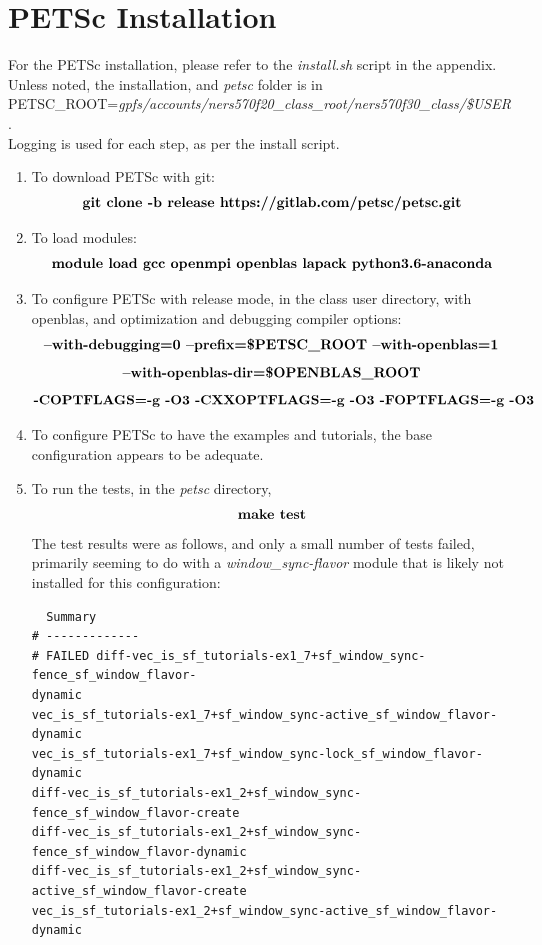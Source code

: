 \documentclass[12pt,letterpaper]{article}
\title{\large \doctitle}
\author{}
\date{}%
\newcommand{\exe}{PETSc }
\newcommand{\cmd}[1]{$$\textrm{\textbf{#1}}$$}
\newcommand{\dir}{\textit{petsc }}
\begin{document}
\maketitle
\thispagestyle{fancy}
\singlespacing

\section{\exe Installation}
For the \exe installation, please refer to the \textit{install.sh} script in the appendix. Unless noted, the installation, and \dir folder is in \\
PETSC\_ROOT=\textit{gpfs/accounts/ners570f20\_class\_root/ners570f30\_class/\$USER}.  \\
Logging is used for each step, as per the install script.
\begin{enumerate}
  \item To download \exe with git: \cmd{git clone -b release https://gitlab.com/petsc/petsc.git}
  \item To load modules: \cmd{module load gcc openmpi openblas lapack python3.6-anaconda}
  \item To configure \exe with release mode, in the class user directory, with openblas, and optimization and debugging compiler options:
  \cmd{--with-debugging=0 --prefix=\$PETSC\_ROOT --with-openblas=1}
  \cmd{--with-openblas-dir=\$OPENBLAS\_ROOT}
  \cmd{-COPTFLAGS=-g -O3 -CXXOPTFLAGS=-g -O3 -FOPTFLAGS=-g -O3}
  \item To configure \exe to have the examples and tutorials, the base configuration appears to be adequate.
  \item To run the tests, in the \dir directory,
  \cmd{make test}
  The test results were as follows, and only a small number of tests failed, primarily seeming to do with a \textit{window\_sync-flavor} module that is likely not installed for this configuration:
  \begin{verbatim}
  Summary
# -------------
# FAILED diff-vec_is_sf_tutorials-ex1_7+sf_window_sync-fence_sf_window_flavor-
dynamic  
vec_is_sf_tutorials-ex1_7+sf_window_sync-active_sf_window_flavor-dynamic
vec_is_sf_tutorials-ex1_7+sf_window_sync-lock_sf_window_flavor-dynamic 
diff-vec_is_sf_tutorials-ex1_2+sf_window_sync-fence_sf_window_flavor-create 
diff-vec_is_sf_tutorials-ex1_2+sf_window_sync-fence_sf_window_flavor-dynamic 
diff-vec_is_sf_tutorials-ex1_2+sf_window_sync-active_sf_window_flavor-create 
vec_is_sf_tutorials-ex1_2+sf_window_sync-active_sf_window_flavor-dynamic 

\end{verbatim}
\end{enumerate}
\end{document}
